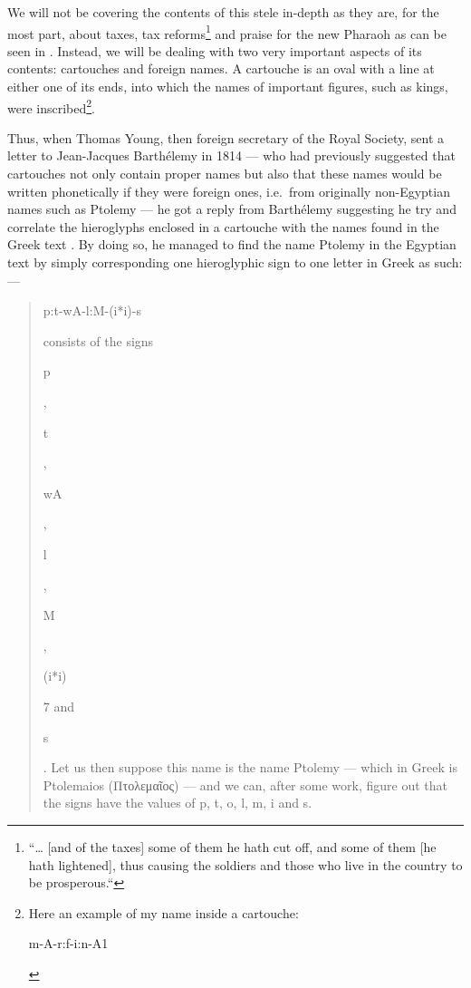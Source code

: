 	We will not be covering the contents of this stele in-depth as they are, for the most part, about taxes, tax reforms\footnote{“… [and of the taxes] some of them he hath cut off, and some of them [he hath lightened], thus causing the soldiers and those who live in the country to be prosperous.“\parencite[p. 202]{nilenotes}} and praise for the new Pharaoh as can be seen in \textcite{nilenotes}. Instead, we will be dealing with two very important aspects of its contents: cartouches and foreign names. A cartouche is an oval with a line at either one of its ends, into which the names of important figures, such as kings, were inscribed\footnote{Here an example of my name inside a cartouche: \SmallerText\SmallerText\begin{hieroglyph}m-A-r:f-i:n-A1\end{hieroglyph}}.

	Thus, when Thomas Young, then foreign secretary of the Royal Society, sent a letter to Jean-Jacques Barthélemy in 1814 — who had previously suggested that cartouches not only contain proper names but also that these names would be written phonetically if they were foreign ones, i.e.\ from originally non-Egyptian names such as Ptolemy — he got a reply from Barthélemy suggesting he try and correlate the hieroglyphs enclosed in a cartouche with the names found in the Greek text \parencite[p. 61]{lostlanguages}. By doing so, he managed to find the name Ptolemy in the Egyptian text by simply corresponding one hieroglyphic sign to one letter in Greek as such: —

	\begin{quote}
		\begin{hieroglyph}p:t-wA-l:M-(i*i)-s\end{hieroglyph} consists of the signs \begin{hieroglyph}p\end{hieroglyph}, \begin{hieroglyph}t\end{hieroglyph}, \begin{hieroglyph}wA\end{hieroglyph}, \begin{hieroglyph}l\end{hieroglyph}, \begin{hieroglyph}M\end{hieroglyph}, \begin{hieroglyph}(i*i)\end{hieroglyph}7 and \begin{hieroglyph}s\end{hieroglyph}. Let us then suppose this name is the name Ptolemy — which in Greek is Ptolemaios (\textgreek{Πτολεμαῖος}) — and we can, after some work, figure out that the signs have the values of p, t, o, l, m, i and s.
	\end{quote}

